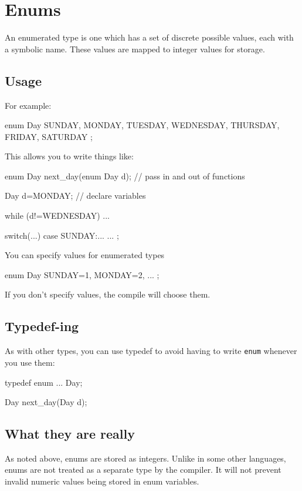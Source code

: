 
\chapter{Enums}

An enumerated type is one which has a set of discrete possible values, each with a symbolic name. 
These values are mapped to integer values for storage.

\section{Usage}

For example:
\begin{codeinline}
enum Day {
    SUNDAY,
    MONDAY,
    TUESDAY,
    WEDNESDAY,
    THURSDAY,
    FRIDAY,
    SATURDAY
};
\end{codeinline}

This allows you to write things like:
\begin{codeinline}
enum Day next_day(enum Day d);  // pass in and out of functions

Day d=MONDAY;  // declare variables

while (d!=WEDNESDAY) ...

switch(...) {   
case SUNDAY:...
...
};
\end{codeinline}


You can specify values for enumerated types
\begin{codeinline}
enum Day {
    SUNDAY=1,
    MONDAY=2,
    ...
};
\end{codeinline}

If you don't specify values, the compile will choose them.

\section{Typedef-ing}
As with other types, you can use typedef to avoid having to write \texttt{enum} whenever you use them:
\begin{codeinline}
typedef enum {
...
} Day;

Day next_day(Day d);
\end{codeinline}


\section{What they are really}

As noted above, enums are stored as integers.
Unlike in some other languages, enums are not treated as a separate type by the compiler.
It will not prevent invalid numeric values being stored in enum variables.

